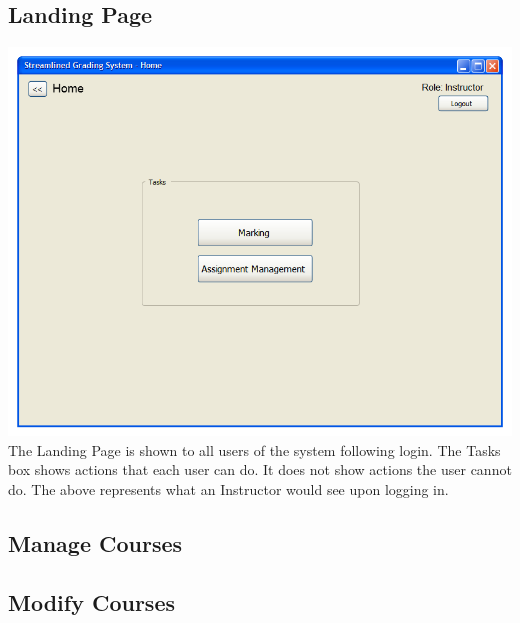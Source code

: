 \documentclass{article}
\begin{document}
\subsection{Landing Page}
\includegraphics[scale=0.55]{../images/UIMockups/pngs/LandingPage} 
\label{landPg}\\
The Landing Page is shown to all users of the system following login.  The Tasks
box shows actions that each user can do.  It does not show actions the user
cannot do. The above represents what an Instructor would see upon logging in.

\subsection{Manage Courses}

\subsection{Modify Courses}
\end{document}
